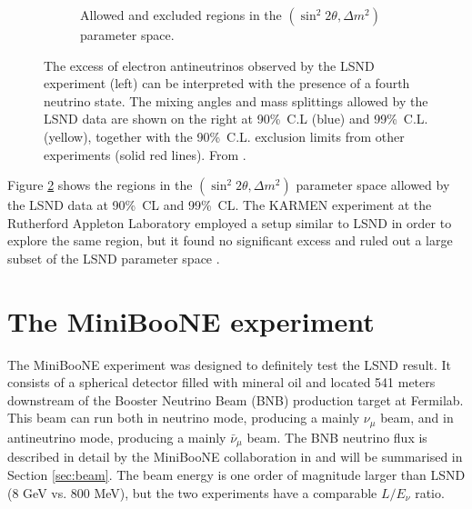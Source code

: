 \begin{figure}[htbp]
\begin{subfigure}{0.45\textwidth}
\begin{center}
        \caption{Allowed and excluded regions in the $(\sin^2 2\theta, \Delta m^2)$ parameter space.}\label{fig:lsnd_space}
    \end{center}
  \end{subfigure}
    \caption{The excess of electron antineutrinos observed by the LSND experiment (left) can be interpreted with the presence of a fourth neutrino state. The mixing angles and mass splittings allowed by the LSND data are shown on the right at 90\%~C.L (blue) and 99\%~C.L. (yellow), together with the 90\%~C.L. exclusion limits from other experiments (solid red lines). From \cite{Aguilar:2001ty}.}
\end{figure}

Figure \ref{fig:lsnd_space} shows the regions in the $(\sin^2 2\theta, \Delta m^2)$ parameter space allowed by the LSND data at 90\%~CL and 99\%~CL. %
The KARMEN experiment at the Rutherford Appleton Laboratory employed a setup similar to LSND in order to explore the same region, but it found no significant excess and ruled out a large subset of the LSND parameter space \cite{Eitel:2000by}. 

\section{The MiniBooNE experiment}\label{sec:miniboone}
The MiniBooNE experiment was designed to definitely test the LSND result. It consists of a spherical detector filled with mineral oil and located 541 meters downstream of the Booster Neutrino Beam (BNB) production target at Fermilab. This beam can run both in neutrino mode, producing a mainly $\nu_{\mu}$ beam, and in antineutrino mode, producing a mainly $\bar{\nu}_{\mu}$ beam. The BNB neutrino flux is described in detail by the MiniBooNE collaboration in \cite{AguilarArevalo:2008yp} and will be summarised in Section \ref{sec:beam}. The beam energy is one order of magnitude larger than LSND (8 GeV vs. 800 MeV), but the two experiments have a comparable $L/E_{\nu}$ ratio.

